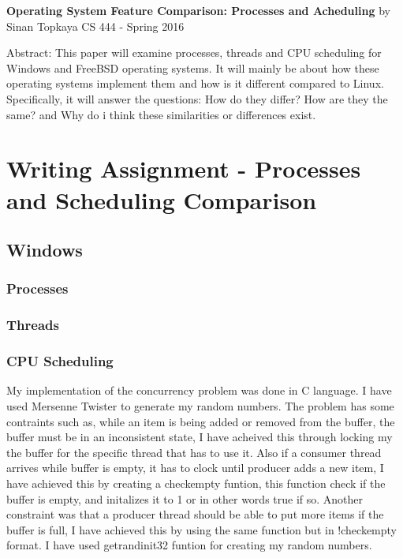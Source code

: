 \documentclass[letterpaper,10pt,draftclsnofoot,onecolumn]{IEEEtran}
\begin{document}
	\begin{titlepage}
		
		\begin{center}
		\bigbreak	
		\textbf{Operating System Feature Comparison: Processes and Acheduling}
		\bigbreak
		by Sinan Topkaya
		\smallbreak
		CS 444 - Spring 2016
		\end{center}
		\vfill
		
		Abstract: This paper will examine processes, threads and CPU scheduling for Windows and FreeBSD operating systems. It will mainly be about how these operating systems implement them and how is it different compared to Linux. Specifically, it will answer the questions: How do they differ? How are they the same? and Why do i think these similarities or differences exist. 
		
	\end{titlepage}

\section*{Writing Assignment - Processes and Scheduling Comparison}

\subsection*{Windows}
\subsubsection*{Processes}
\subsubsection*{Threads}
\subsubsection*{CPU Scheduling}

My implementation of the concurrency problem was done in C language. I have used Mersenne Twister to generate my random numbers. The problem has some contraints such as, while an item is being added or removed from the buffer, the buffer must be in an inconsistent state, I have acheived this through locking my the buffer for the specific thread that has to use it. Also if a consumer thread arrives while buffer is empty, it has to clock until producer adds a new item, I have achieved this by creating a checkempty funtion, this function check if the buffer is empty, and initalizes it to 1 or in other words true if so. Another constraint was that a producer thread should be able to put more items if the buffer is full, I have achieved this by using the same function but in !checkempty format. I have used getrandinit32 funtion for creating my random numbers.
\end{document}
